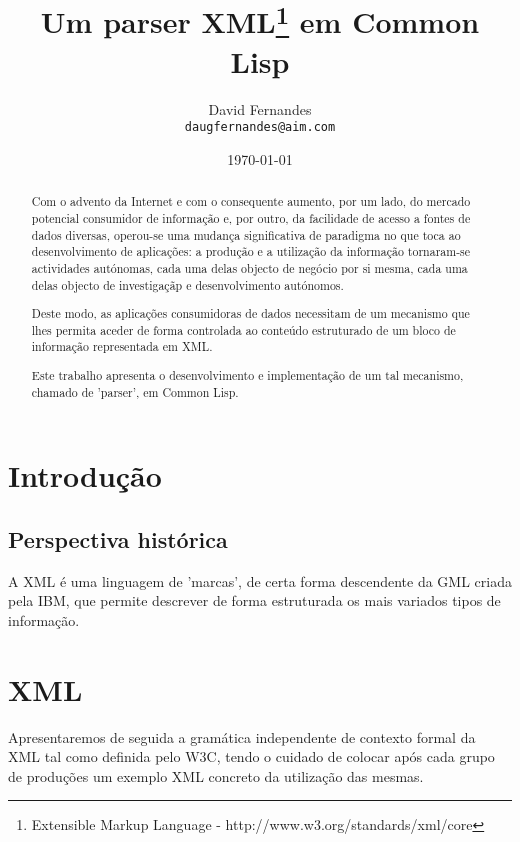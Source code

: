 \documentclass[a4,11pt]{article}
\title{Um parser XML\footnote{Extensible Markup Language - http://www.w3.org/standards/xml/core} em Common Lisp}
\author{David Fernandes\\
\texttt{daugfernandes@aim.com}}
\date{\today}
\begin{document}
\maketitle

\begin{abstract}

\begin{multicols}{2}

Com o advento da Internet e com o consequente aumento, por um lado, do mercado potencial consumidor de informa\c{c}\~{a}o e, por outro, da facilidade de acesso a fontes de dados diversas, operou-se uma mudan\c{c}a significativa de paradigma no que toca ao desenvolvimento de aplica\c{c}\~{o}es: a produ\c{c}\~{a}o e a utiliza\c{c}\~{a}o da informa\c{c}\~{a}o tornaram-se actividades aut\'{o}nomas, cada uma delas objecto de neg\'{o}cio por si mesma, cada uma delas objecto de investiga\c{c}\~{a}p e desenvolvimento aut\'{o}nomos.

Deste modo, as aplica\c{c}\~{o}es consumidoras de dados necessitam de um mecanismo que lhes permita aceder de forma controlada ao conte\'{u}do estruturado de um bloco de informa\c{c}\~{a}o representada em XML.

Este trabalho apresenta o desenvolvimento e implementa\c{c}\~{a}o de um tal mecanismo, chamado de 'parser', em Common Lisp.

\end{multicols}

\end{abstract}

\section{Introdu\c{c}\~{a}o}

\subsection{Perspectiva hist\'{o}rica\cite{W3C06}}

A XML \'{e} uma linguagem de 'marcas', de certa forma descendente da GML criada pela IBM, que permite descrever de forma estruturada os mais variados tipos de informa\c{c}\~{a}o.

\section{XML}

Apresentaremos de seguida a gram\'{a}tica independente de contexto formal da XML tal como definida pelo W3C, tendo o cuidado de colocar ap\'{o}s cada grupo de produ\c{c}\~{o}es um exemplo XML concreto da utiliza\c{c}\~{a}o das mesmas.
\end{document}
